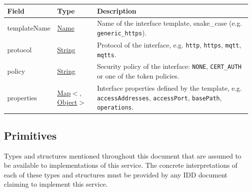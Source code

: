 \documentclass[a4paper]{arrowhead}
\newcommand{\pref}[1]{{\textcolor{ArrowheadGrey}{\hyperref[sec:model:primitives:#1]{#1}}}}
\begin{document}
\noindent\begin{tabularx}{\textwidth}{| >{\raggedright\arraybackslash}p{3.9cm} | >{\raggedright\arraybackslash\small}p{5.3cm} | X |} \hline
\rowcolor{gray!33} Field & Type & Description \\ \hline
template\allowbreak{}Name & \pref{Name} & Name of the interface template, snake\_case (e.g. \texttt{generic\_\allowbreak{}https}). \\ \hline
protocol & \pref{String} & Protocol of the interface, e.g. \texttt{http}, \texttt{https}, \texttt{mqtt}, \texttt{mqtts}. \\ \hline
policy & \pref{String} & Security policy of the interface: \texttt{NONE}, \texttt{CERT\_\allowbreak{}AUTH} or one of the token policies. \\ \hline
properties & \pref{Map}$<$\allowbreak{}\pref{String}, \pref{Object}$>$ & Interface properties defined by the template, e.g. \texttt{accessAddresses}, \texttt{accessPort}, \texttt{basePath}, \texttt{operations}. \\ \hline
\end{tabularx}



\subsection{Primitives}
\label{sec:model:primitives}

Types and structures mentioned throughout this document that are assumed to be available to implementations of this service.
The concrete interpretations of each of these types and structures must be provided by any IDD document claiming to implement this service.
\end{document}
